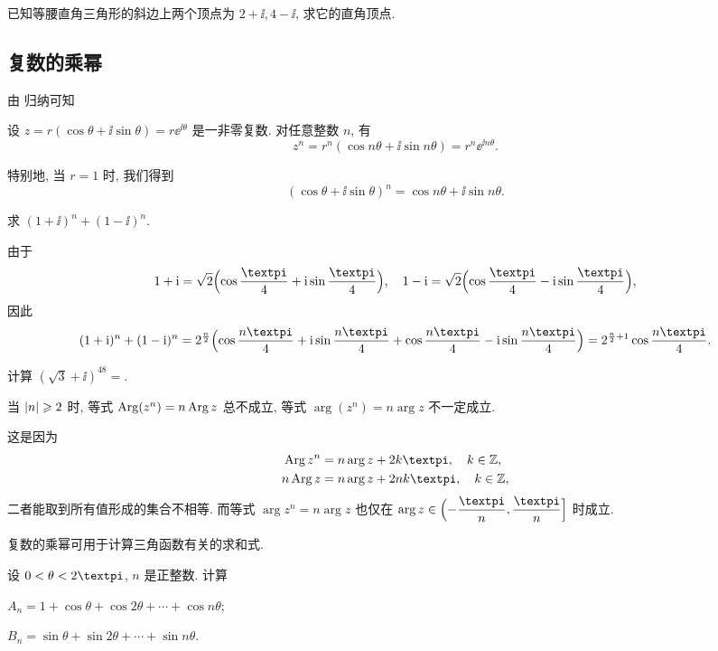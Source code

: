 \begin{exercise}
  已知等腰直角三角形的斜边上两个顶点为 $2+\ii,4-\ii$, 求它的直角顶点.
\end{exercise}


\subsection{复数的乘幂}

由 归纳可知
\begin{theorem}
  设 $z=r(\cos\theta+\ii\sin\theta)=r\ee^{\ii\theta}$ 是一非零复数.
  对任意整数 $n$, 有
  \[
    z^n=r^n(\cos{n\theta}+\ii\sin{n\theta})
    =r^n\ee^{\ii n\theta}.
  \]
\end{theorem}
特别地, 当 $r=1$ 时, 我们得到
\[
  (\cos\theta+\ii\sin\theta)^n=\cos{n\theta}+\ii\sin{n\theta}.
\]

\begin{example}
  求 $(1+\ii)^n+(1-\ii)^n$.
\end{example}

\begin{solution}
  由于
  \[
    1+\ii=\sqrt2\Bigl(\cos\frac\cpi4+\ii\sin\frac\cpi4\Bigr),\quad
    1-\ii=\sqrt2\Bigl(\cos\frac\cpi4-\ii\sin\frac\cpi4\Bigr),
  \]
  因此
  \[
     (1+\ii)^n+(1-\ii)^n
    =2^{\frac n2}\Bigl(\cos\frac{n\cpi}4+\ii\sin\frac{n\cpi}4 
      +\cos\frac{n\cpi}4-\ii\sin\frac{n\cpi}4\Bigr)
    =2^{\frac n2+1}\cos\frac{n\cpi}4.
  \]
\end{solution}

\begin{exercise}
  计算 $(\sqrt3+\ii)^{48}=$\fillblank{}.
\end{exercise}

\begin{marker}
  当 $\lvert n\rvert\geqslant 2$ 时, 等式 $\operatorname{Arg}(z^n)=n\operatorname{Arg} z$ 总不成立, 等式 $\arg(z^n)=n\arg z$ 不一定成立.
\end{marker}

这是因为
\begin{align*}
  \Arg z^n&=n\arg z+2k\cpi,\quad k\in\BZ,\\
  n\Arg z&=n\arg z+2nk\cpi,\quad k\in\BZ,
\end{align*}
二者能取到所有值形成的集合不相等.
而等式 $\arg z^n=n\arg z$ 也仅在 $\arg z\in\Bigl(-\dfrac{\cpi}n,\dfrac\cpi n\Bigr]$ 时成立.

复数的乘幂可用于计算三角函数有关的求和式.

\begin{example}
  设 $0<\theta<2\cpi$, $n$ 是正整数. 计算
  \begin{subexample}
    \item $A_n=1+\cos\theta+\cos{2\theta}+\cdots+\cos{n\theta}$;
    \item $B_n=\sin\theta+\sin{2\theta}+\cdots+\sin{n\theta}$.
  \end{subexample}
\end{example}

